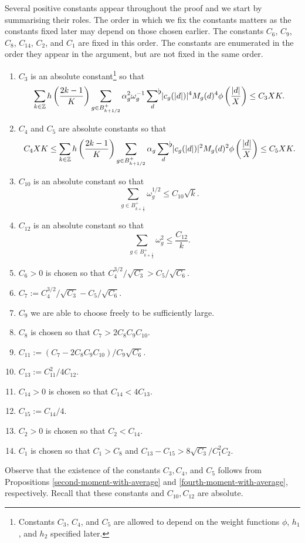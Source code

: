 \documentclass[a4paper,10pt,twoside]{amsart}
\theoremstyle{definition}
\numberwithin{equation}{section}
\newcommand\Z{\mathbb{Z}}
\renewcommand\:{\colon}
\newcommand{\sumflat}{\mathop{{\sum}^{\raisebox{-3pt}{\makebox[0pt][l]{$\flat$}}}}}
\begin{document}
Several positive constants appear throughout the proof and we start by summarising their roles. The order in which we fix the constants matters as the constants fixed later may depend on those chosen earlier. The constants $C_6$, $C_9$, $C_8$, $C_{14 }$, $C_{2}$, and $C_1$ are fixed in this order. The constants are enumerated in the order they appear in the argument, but are not fixed in the same order.  
\begin{enumerate}
\item $C_3$ is an absolute constant\footnote{Constants $C_3$, $C_4$, and $C_5$ are allowed to depend on the weight functions $\phi$, $h_1$, and $h_2$ specified later.} so that 
\[ 
\sum_{k\in\Z}h\left(\frac{2k-1}K\right)\sum_{g\in B_{k+1/2}^+}\alpha_g^2\omega_g^{-1}\sumflat_d\,|c_g(|d|)|^4M_g(d)^4\phi\left(\frac{|d|}X\right)\leq C_3 XK. 
\]
\item $C_4$ and $C_5$ are absolute constants so that
\[ 
C_4XK\leq \sum_{k\in\Z}h\left(\frac{2k-1}K\right)\sum_{g\in B_{k+1/2}^+}\alpha_g\sumflat_d\,|c_g(|d|)|^2M_g(d)^2\phi\left(\frac{|d|}X\right)\leq C_5XK.\]
\item $C_{10}$ is an absolute constant so that
\[
\sum_{g\in B_{k+\frac12}^+}\omega_g^{1/2}\leq C_{10}\sqrt k. 
\]
\item $C_{12}$ is an absolute constant so that
\[
\sum_{g\in B_{k+\frac12}^+}\omega_g^{2}\leq\frac{C_{12}}k. 
\]
\item $C_6>0$ is chosen so that $C_4^{3/2}/\sqrt{C_3}>C_5/\sqrt{C_6}$.
\item $C_7:=C_4^{3/2}/\sqrt{C_3}-C_5/\sqrt{C_6}$. 
\item $C_9$ we are able to choose freely to be sufficiently large.
\item $C_8$ is chosen so that $C_7>2C_8C_9C_{10}$. 
\item $C_{11}:=(C_7-2C_8C_9C_{10})/C_9\sqrt{C_6}$. 
\item $C_{13}:=C_{11}^2/4C_{12}$.
\item $C_{14}>0$ is chosen so that $C_{14}<4C_{13}$. 
\item $C_{15}:=C_{14}/4$. 
\item $C_2>0$ is chosen so that $C_2<C_{14}$. 
\item $C_1$ is chosen so that $C_1>C_8$ and $C_{13}-C_{15}>8\sqrt{C_3}/C_1^2C_2$.  
\end{enumerate}
\noindent Observe that the existence of the constants $C_3,C_4$, and $C_5$ follows from Propositions \ref{second-moment-with-average} and \ref{fourth-moment-with-average}, respectively. Recall that these constants and $C_{10}, C_{12}$ are absolute. 
\end{document}
